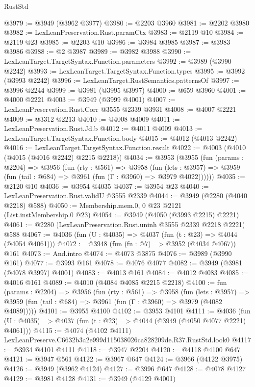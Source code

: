 \begin{lexlean}{RustStd}
\begin{coremodule}
@3979 := @3949 (@3962 @3977)
@3980 := @2203 @3960
@3981 := @2202 @3980
@3982 := LexLeanPreservation.Rust.paramCtx
@3983 := @2119 @10
@3984 := @2119 @23
@3985 := @2203 @10
@3986 := @3984 @3985
@3987 := @3983 @3986
@3988 := @2 @3987
@3989 := @3982 @3988
@3990 := LexLeanTarget.TargetSyntax.Function.parameters
@3992 := @3989 (@3990 @2242)
@3993 := LexLeanTarget.TargetSyntax.Function.types
@3995 := @3992 (@3993 @2242)
@3996 := LexLeanTarget.RustSemantics.patternsOf
@3997 := @3996 @2244
@3999 := @3981 (@3995 @3997)
@4000 := @659 @3960
@4001 := @4000 @2221
@4003 := @3949 (@3999 @4001)
@4007 := LexLeanPreservation.Rust.Corr @3555 @2339 @3931
@4008 := @4007 @2221
@4009 := @3312 @2213
@4010 := @4008 @4009
@4011 := LexLeanPreservation.Rust.Jd.b
@4012 := @4011 @4009
@4013 := LexLeanTarget.TargetSyntax.Function.body
@4015 := @4012 (@4013 @2242)
@4016 := LexLeanTarget.TargetSyntax.Function.result
@4022 := @4003 (@4010 (@4015 (@4016 @2242) @2215 @2218))
@4034 := @3953
    (@3955
      (fun (params : @2204) =>
      @3956
        (fun (rty : @561) =>
        @3958
          (fun (lets : @3957) =>
          @3959 (fun (tail : @684) => @3961 (fun (Γ : @3960) => @3979 @4022))))))
@4035 := @2120 @10
@4036 := @3954 @4035
@4037 := @3954 @23
@4040 := LexLeanPreservation.Rust.validU @3555 @2339
@4044 := @3949 (@2280 (@4040 @2218) @588)
@4050 := Membership.mem.{0, 0} @23 @2121 (List.instMembership.{0} @23)
@4054 := @3949 (@4050 (@3993 @2215) @2221)
@4061 := @2280 (LexLeanPreservation.Rust.uninh @3555 @2339 @2218 @2221) @588
@4067 := @4036 (fun (U : @4035) => @4037 (fun (t : @23) => @4044 (@4054 @4061)))
@4072 := @3948 (fun (fn : @7) => @3952 (@4034 @4067)) @161
@4073 := And.intro
@4074 := @4073 @3875
@4076 := @3989 (@3990 @161)
@4077 := @3993 @161
@4078 := @4076 @4077
@4082 := @3949 (@3981 (@4078 @3997) @4001)
@4083 := @4013 @161
@4084 := @4012 @4083
@4085 := @4016 @161
@4089 := @4010 (@4084 @4085 @2215 @2218)
@4100 := fun (params : @2204) =>
  @3956
    (fun (rty : @561) =>
    @3958
      (fun (lets : @3957) =>
      @3959 (fun (tail : @684) => @3961 (fun (Γ : @3960) => @3979 (@4082 @4089)))))
@4101 := @3955 @4100
@4102 := @3953 @4101
@4111 := @4036 (fun (U : @4035) => @4037 (fun (t : @23) => @4044 (@3949 (@4050 @4077 @2221) @4061)))
@4115 := @4074 (@4102 @4111) LexLeanPreserve.C6632b3a2e999d115038026ca828209de.R37.RustStd.look0
@4117 := @3934 @4101 @4111
@4118 := @3947 @2204
@4120 := @4118 @4100 @647
@4121 := @3947 @561
@4122 := @3967 @647
@4124 := @3966 (@4122 @3975)
@4126 := @3949 (@3962 @4124)
@4127 := @3996 @647
@4128 := @4078 @4127
@4129 := @3981 @4128
@4131 := @3949 (@4129 @4001)

\end{coremodule}
\end{lexlean}
